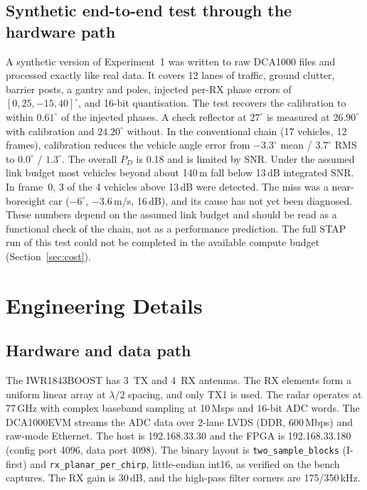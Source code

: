 \documentclass[conference]{IEEEtran}
\begin{document}
\subsection{Synthetic end-to-end test through the hardware path}
A synthetic version of Experiment~1 was written to raw DCA1000 files and processed exactly like
real data. It covers 12 lanes of traffic, ground clutter, barrier posts, a gantry and poles,
injected per-RX phase errors of $[0,25,-15,40]^\circ$, and 16-bit quantisation. The test
recovers the calibration to within $0.61^\circ$ of the injected phases. A check reflector at
$27^\circ$ is measured at $26.90^\circ$ with calibration and $24.20^\circ$ without. In the
conventional chain (17 vehicles, 12 frames), calibration reduces the vehicle angle error from
$-3.3^\circ$ mean / $3.7^\circ$ RMS to $0.0^\circ$ / $1.3^\circ$. The overall $P_D$ is 0.18 and is
limited by SNR. Under the assumed link budget most vehicles beyond about 140\,m fall below 13\,dB
integrated SNR. In frame~0, 3 of the 4 vehicles above 13\,dB were detected. The miss was a
near-boresight car ($-6^\circ$, $-3.6$\,m/s, 16\,dB), and its cause has not yet been diagnosed.
These numbers depend on the assumed link budget and should be read as a functional check of the
chain, not as a performance prediction. The full STAP run of this
test could not be completed in the available compute budget (Section~\ref{sec:cost}).

\section{Engineering Details}
\subsection{Hardware and data path}
The IWR1843BOOST has 3~TX and 4~RX antennas. The RX elements form a uniform linear array at
$\lambda/2$ spacing, and only TX1 is used. The radar operates at 77\,GHz with complex baseband
sampling at 10\,Msps and 16-bit ADC words. The DCA1000EVM streams the ADC data over 2-lane LVDS
(DDR, 600\,Mbps) and raw-mode Ethernet. The host is 192.168.33.30 and the FPGA is 192.168.33.180
(config port 4096, data port 4098). The binary layout is \texttt{two\_sample\_blocks} (I-first)
and \texttt{rx\_planar\_per\_chirp}, little-endian int16, as verified on the bench captures. The
RX gain is 30\,dB, and the high-pass filter corners are 175/350\,kHz.
\end{document}
